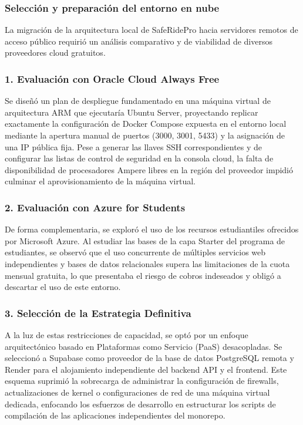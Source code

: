 \documentclass{article}
\begin{document}
\subsubsection{Selección y preparación del entorno en nube}
La migración de la arquitectura local de SafeRidePro hacia servidores remotos de acceso público requirió un análisis comparativo y de viabilidad de diversos proveedores cloud gratuitos.

\subsubsection*{1. Evaluación con Oracle Cloud Always Free}
Se diseñó un plan de despliegue fundamentado en una máquina virtual de arquitectura ARM que ejecutaría Ubuntu Server, proyectando replicar exactamente la configuración de Docker Compose expuesta en el entorno local mediante la apertura manual de puertos (3000, 3001, 5433) y la asignación de una IP pública fija. Pese a generar las llaves SSH correspondientes y de configurar las listas de control de seguridad en la consola cloud, la falta de disponibilidad de procesadores Ampere libres en la región del proveedor impidió culminar el aprovisionamiento de la máquina virtual.

\subsubsection*{2. Evaluación con Azure for Students}
De forma complementaria, se exploró el uso de los recursos estudiantiles ofrecidos por Microsoft Azure. Al estudiar las bases de la capa Starter del programa de estudiantes, se observó que el uso concurrente de múltiples servicios web independientes y bases de datos relacionales supera las limitaciones de la cuota mensual gratuita, lo que presentaba el riesgo de cobros indeseados y obligó a descartar el uso de este entorno.

\subsubsection*{3. Selección de la Estrategia Definitiva}
A la luz de estas restricciones de capacidad, se optó por un enfoque arquitectónico basado en Plataformas como Servicio (PaaS) desacopladas. Se seleccionó a Supabase como proveedor de la base de datos PostgreSQL remota y Render para el alojamiento independiente del backend API y el frontend. Este esquema suprimió la sobrecarga de administrar la configuración de firewalls, actualizaciones de kernel o configuraciones de red de una máquina virtual dedicada, enfocando los esfuerzos de desarrollo en estructurar los scripts de compilación de las aplicaciones independientes del monorepo.
\end{document}
